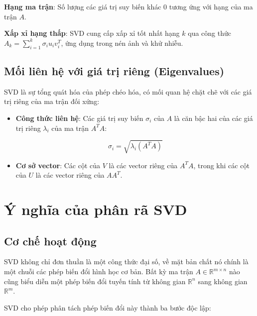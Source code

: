 \textbf{Hạng ma trận}: Số lượng các giá trị suy biến khác 0 tương ứng với hạng của ma trận $A$.

\textbf{Xấp xỉ hạng thấp}: SVD cung cấp xấp xỉ tốt nhất hạng $k$ qua công thức $A_k = \sum_{i = 1}^{k} \sigma_i u_i v_i^T$, ứng dụng trong nén ảnh và khử nhiễu.

\subsection{Mối liên hệ với giá trị riêng (Eigenvalues)}

SVD là sự tổng quát hóa của phép chéo hóa, có mối quan hệ chặt chẽ với các giá trị riêng của ma trận đối xứng:

\begin{itemize}[topsep=0pt, itemsep=2.5pt, leftmargin=1.5cm]
    \item \textbf{Công thức liên hệ}: Các giá trị suy biến $\sigma_i$ của $A$ là căn bậc hai của các giá trị riêng $\lambda_i$ của ma trận $A^TA$:

    \begin{equation}
        \sigma_i = \sqrt{\lambda_i(A^TA)}
    \end{equation}

    \item \textbf{Cơ sở vector}: Các cột của $V$ là các vector riêng của $A^TA$, trong khi các cột của $U$ là các vector riêng của $AA^T$.
\end{itemize}

\section{Ý nghĩa của phân rã SVD}

\subsection{Cơ chế hoạt động}

SVD không chỉ đơn thuần là một công thức đại số, về mặt bản chất nó chính là một chuỗi các phép biến đổi hình học cơ bản. Bất kỳ ma trận $A \in \mathbb{R}^{m \times n}$ nào cũng biểu diễn một phép biến đổi tuyến tính từ không gian $\mathbb{R}^n$ sang không gian $\mathbb{R}^m$.

SVD cho phép phân tách phép biến đổi này thành ba bước độc lập:

